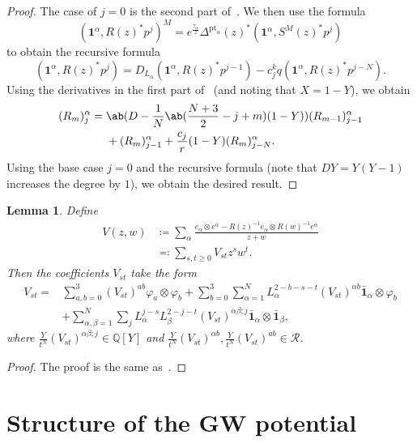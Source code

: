 \documentclass[10pt]{amsart}
\newtheorem{lem}[thm]{Lemma}
\theoremstyle{definition}
\theoremstyle{remark}
\theoremstyle{plain}
\theoremstyle{definition}
\theoremstyle{remark}
\newcommand{\Q}{\mathbb{Q}}
\newcommand{\msc}[1]{\mathscr{#1}}
\newcommand{\mr}[1]{\mathrm{#1}}
\newcommand{\1}{\mathbf{1}}
\newcommand{\2}{\mathbf{2}}
\newcommand{\3}{\mathbf{3}}
\newcommand{\pt}{\mr{pt}}
\numberwithin{equation}{section}
\begin{document}
\begin{proof}
    The case of $j=0$ is the second part of~. We then use the formula
    \[ (\1^{\alpha}, R(z)^* p^j)^M = e^{\frac{\tau_{\alpha}}{z}} \Delta^{\pt_{\alpha}}(z)^* (\1^{\alpha}, S^M(z)^*p^j) \]
    to obtain the recursive formula
    \[ (\1^{\alpha}, R(z)^* p^j) = D_{L_{\alpha}} (\1^{\alpha}, R(z)^* p^{j-1}) - c_j^k q (\1^{\alpha}, R(z)^* p^{j-N}). \]
    Using the derivatives in the first part of~ (and noting that $X = 1-Y$), we obtain
    \begin{align*}
        (R_m)_j^{\alpha} ={}& \ab(D-\frac{1}{N} \ab(\frac{N+3}{2}-j+m)(1-Y)) (R_{m-1})_{j-1}^{\alpha} \\
        &+ (R_m)_{j-1}^{\alpha} + \frac{c_j}{r}(1-Y)(R_m)_{j-N}^{\alpha}.
    \end{align*}
    Using the base case $j=0$ and the recursive formula (note that $DY = Y(Y-1)$ increases the degree by $1$), we obtain the desired result.
\end{proof}

\begin{lem}
    Define
    \begin{align*}
        V(z,w) &\coloneqq \sum_{\alpha} \frac{e_{\alpha}\otimes e^{\alpha} - R(z)^{-1} e_{\alpha} \otimes R(w)^{-1} e^{\alpha}}{z+w} \\
        &\eqqcolon \sum_{s,t \geq 0} V_{st} z^s w^t.
    \end{align*}
    Then the coefficients $V_{st}$ take the form
    \begin{align*}
        V_{st} ={}& \sum_{a,b=0}^3 ( V_{st} )^{ab} \varphi_a \otimes \varphi_b + \sum_{b=0}^3 \sum_{\alpha=1}^N L_{\alpha}^{2-b-s-t} ( V_{st} )^{\alpha b} \bar{\1}_{\alpha} \otimes \varphi_b \\
        &+ \sum_{\alpha,\beta = 1}^N \sum_j L_{\alpha}^{j-s} L_{\beta}^{2-j-t} ( V_{st} )^{\alpha\beta;j} \bar{\1}_{\alpha} \otimes \bar{\1}_{\beta},
    \end{align*}
    where $\frac{Y}{t^N} ( V_{st} )^{\alpha\beta;j} \in \Q[Y]$ and $\frac{Y}{t^N} ( V_{st} )^{\alpha b}, \frac{Y}{t^N}( V_{st} )^{ab} \in \msc{R}$.  
\end{lem}

\begin{proof}
    The proof is the same as~\cite[Lemma 5.5]{nmsp2}.
\end{proof}






\section{Structure of the GW potential}%
\label{sec:Structure of the GW potential}
\end{document}
